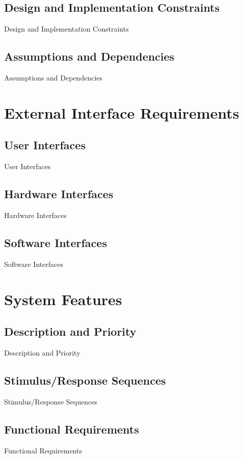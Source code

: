 \documentclass{article}
\begin{document}
\begin{CJK}{UTF8}{bkai}
\subsection{\Large Design and Implementation Constraints\\}
   \Large Design and Implementation Constraints
\newpage
\subsection{\Large  Assumptions and Dependencies\\}
  \Large  Assumptions and Dependencies
\newpage


\section{\huge\bf  \color{blue} External Interface Requirements\\}
\subsection{\Large User Interfaces\\}
User Interfaces
\newpage
\subsection{\Large Hardware Interfaces\\}
Hardware Interfaces
\newpage
\subsection{\Large Software Interfaces\\}
 Software Interfaces
\newpage



\section{\huge\bf \color{blue}  System Features }
\subsection{\Large Description and Priority }
 Description and Priority 
\newpage
\subsection{\Large Stimulus/Response Sequences}
Stimulus/Response Sequences
\newpage
\subsection{ \Large Functional Requirements}
 Functional Requirements
\newpage



\end{CJK}
\end{document}
